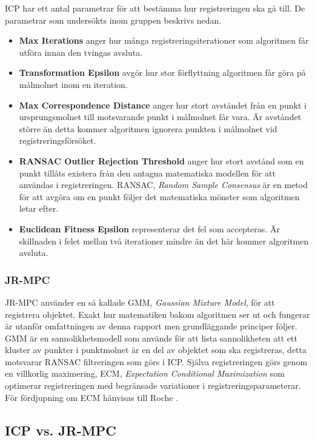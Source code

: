 ICP har ett antal parametrar för att bestämma hur registreringen ska gå till. De parametrar som undersökts inom gruppen beskrivs nedan.
\begin{itemize}
	\item \textbf{Max Iterations} anger hur många registrerings\-iterationer som algoritmen får utföra innan den tvingas avsluta.
	\item \textbf{Transformation Epsilon} avgör hur stor förflyttning algoritmen får göra på målmolnet inom en iteration.
	\item \textbf{Max Correspondence Distance} anger hur stort avståndet från en punkt i ursprungsmolnet till motsvarande punkt i målmolnet får vara. Är avståndet större än detta kommer algoritmen ignorera punkten i målmolnet vid registreringsförsöket.
	\item \textbf{RANSAC Outlier Rejection Threshold} anger hur stort avstånd som en punkt tillåts existera från den antagna matematiska modellen för att användas i registreringen. RANSAC, \textit{Random Sample Consensus} är en metod för att avgöra om en punkt följer det matematiska mönster som algoritmen letar efter.
	\item \textbf{Euclidean Fitness Epsilon} representerar det fel som accepteras. Är skillnaden i felet mellan två iterationer mindre än det här kommer algoritmen avsluta.
\end{itemize}

\subsubsection{JR-MPC}
JR-MPC använder en så kallade GMM, \textit{Gaussian Mixture Model}, för att registrera objektet. Exakt hur matematiken bakom algoritmen ser ut och fungerar är utanför omfattningen av denna rapport men grundläggande principer följer. GMM är en sannolikhetsmodell som används för att lista sannolikheten att ett kluster av punkter i punktmolnet är en del av objektet som ska registreras, detta motsvarar RANSAC filtreringen som görs i ICP. Själva registreringen görs genom en villkorlig maximering, ECM, \textit{Expectation Conditional Maximization} som optimerar registreringen med begränsade variationer i registreringsparameterar. För fördjupning om ECM hänvisas till Roche \cite{roche2011algorithm}.

\subsection{ICP vs. JR-MPC}

